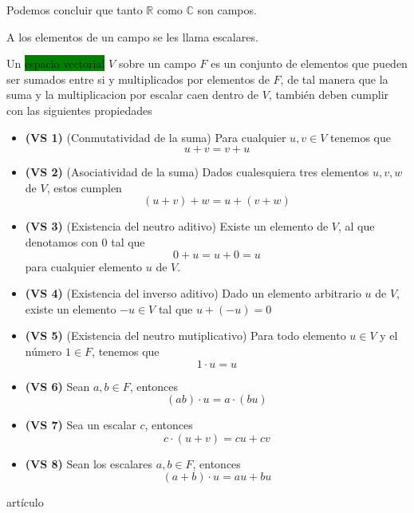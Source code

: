 \documentclass[11pt]{article}
\begin{document}
Podemos concluir que tanto $\mathbb{R}$ como $\mathbb{C}$ son campos.

A los elementos de un campo se les llama escalares.

Un \colorbox{Green}{espacio vectorial} $V$ sobre un campo $F$ es un conjunto de elementos que pueden ser sumados entre si y multiplicados por elementos de $F$, de tal manera que la suma y la multiplicacion por escalar caen dentro de $V$, también deben cumplir con las siguientes propiedades

\begin{itemize}
    \item \textbf{(VS 1)} (Conmutatividad de la suma) Para cualquier $u,v\in V$ tenemos que
    \[
    u+v=v+u
    \]
    \item \textbf{(VS 2)} (Asociatividad de la suma) Dados cualesquiera tres elementos $u,v,w$ de $V$, estos cumplen
    \[
    (u+v)+w=u+(v+w)
    \]
    \item \textbf{(VS 3)} (Existencia del neutro aditivo) Existe un elemento de $V$, al que denotamos con $0$ tal que
    \[
    0+u=u+0=u
    \]
    para cualquier elemento $u$ de $V$.
    \item \textbf{(VS 4)} (Existencia del inverso aditivo) Dado un elemento arbitrario $u$ de $V$, existe un elemento $-u\in V$ tal que $u+(-u)=0$
    \item \textbf{(VS 5)} (Existencia del neutro mutiplicativo) Para todo elemento $u\in V$ y el número $1\in F$, tenemos que 
    \[
    1\cdot u =u
    \]
    \item \textbf{(VS 6)} Sean $a,b\in F$, entonces
    \[
    (ab)\cdot u = a \cdot (bu)
    \]
    \item \textbf{(VS 7)} Sea un escalar $c$, entonces
    \[
    c\cdot(u+v)=cu+cv
    \]
    \item \textbf{(VS 8)} Sean los escalares $a,b\in F$, entonces
    \[
    (a+b)\cdot u= au+bu
    \]
    
    
\end{itemize}



\newpage

\begin{thebibliography}{artículo}

\end{thebibliography}
\end{document}
